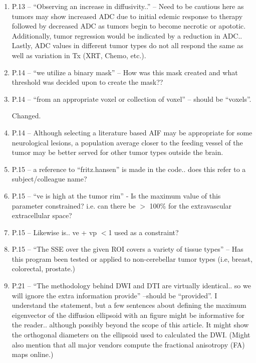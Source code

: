 \documentclass[11pt]{article}
\begin{document}
\begin{enumerate}
\item P.13 – ``Observing an increase in diffusivity..'' – Need to be
  cautious here as tumors may show increased ADC due to initial edemic
  response to therapy followed by decreased ADC as tumors begin to
  become necrotic or apototic. Additionally, tumor regression would be
  indicated by a reduction in ADC.. Lastly, ADC values in different
  tumor types do not all respond the same as well as variation in Tx
  (XRT, Chemo, etc.).

\item P.14 – ``we utilize a binary mask'' – How was this mask created
  and what threshold was decided upon to create the mask??

\item P.14 – ``from an appropriate voxel or collection of voxel'' –
  should be ``voxels''.

  Changed.

\item P.14 – Although selecting a literature based AIF may be
  appropriate for some neurological lesions, a population average
  closer to the feeding vessel of the tumor may be better served for
  other tumor types outside the brain.

\item P.15 – a reference to ``fritz.hansen'' is made in the
  code.. does this refer to a subject/colleague name?

\item P.15 – ``ve is high at the tumor rim'' - Is the maximum value of
  this parameter constrained? i.e. can there be $>$ 100\% for the
  extravascular extracellular space?

\item P.15 – Likewise is.. ve + vp $<$1 used as a constraint?

\item P.15 – ``The SSE over the given ROI covers a variety of tissue
  types'' – Has this program been tested or applied to non-cerebellar
  tumor types (i.e, breast, colorectal, prostate.)

\item P.21 – ``The methodology behind DWI and DTI are virtually
  identical.. so we will ignore the extra information provide''
  –should be ``provided''.  I understand the statement, but a few
  sentences about defining the maximum eigenvector of the diffusion
  ellipsoid with an figure might be informative for the
  reader.. although possibly beyond the scope of this article. It
  might show the orthogonal diameters on the ellipsoid used to
  calculated the DWI. (Might also mention that all major vendors
  compute the fractional anisotropy (FA) maps online.)


\end{enumerate}
\end{document}
